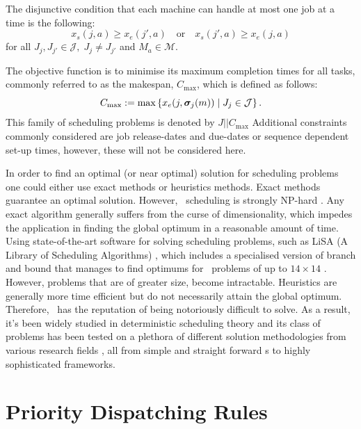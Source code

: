 \documentclass[smallextended]{svjour3}
\begin{document}
	The disjunctive condition that each machine can handle at most one job at a 
	time is the following: 
	\begin{equation}\label{eq:oneJobPerMac}
	x_s(j,a) \geq x_e(j',a) \quad\textrm{or}\quad x_s(j',a) \geq x_e(j,a)  
	\end{equation}
	for all $J_j,J_{j'}\in\mathcal{J},\; J_j\neq J_{j'}$ and $M_a\in\mathcal{M}$. 
	
	The objective function is to minimise its maximum completion times for all 
	tasks, commonly referred to as the makespan, $C_{\max}$, which is defined as 
	follows:
	\begin{equation}
	C_{\max} := 
	\max\left\{x_e(j,\bm \sigma_j(m))\;\middle|\;J_j\in\mathcal{J}\right\}.\label{eq:makespan}
	\end{equation} 
	This family of scheduling problems is denoted by $J||C_{\max}$ 
	\cite{Pinedo08}
	Additional constraints commonly considered are job release-dates and due-dates 
	or sequence dependent set-up times, however, these will not be considered here. 
	
	In order to find an optimal (or near optimal) solution for scheduling problems 
	one could either use exact methods or heuristics methods. Exact methods 
	guarantee an optimal solution. However, \jsp\ scheduling is strongly NP-hard 
	\cite{Garey76:NPhard}. Any exact algorithm generally suffers from the curse of 
	dimensionality, which impedes the application in finding the global optimum in 
	a reasonable amount of time. 
	Using state-of-the-art software for solving scheduling problems, such as 
	LiSA %
	(A Library of Scheduling Algorithms) \cite{LiSA}, which includes a specialised 
	version of branch and bound that manages to find optimums for \jsp\ problems of 
	up to $14\times14$ \cite{Ru12}. However, problems that are of greater size, 
	become intractable. 
	Heuristics are generally more time efficient but 
	do not necessarily attain the global optimum. Therefore, \jsp\ has the 
	reputation of being notoriously difficult to solve. 
	As a result, it's been widely studied in deterministic scheduling theory and 
	its class of problems has been tested on a plethora of different solution 
	methodologies from various research fields \cite{Meeran12}, all from simple and 
	straight forward \dr s to highly sophisticated frameworks.
	
	
	\section{Priority Dispatching Rules} \label{sec:DR}
	
\end{document}
